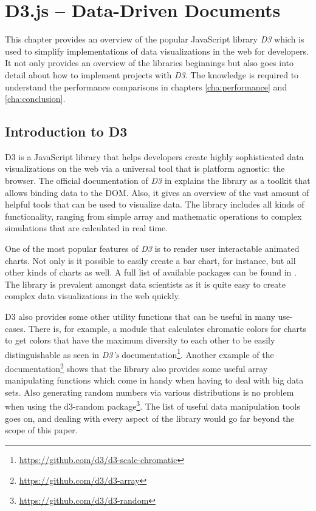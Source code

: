 \chapter{D3.js – Data-Driven Documents}
\label{cha:d3js}

This chapter provides an overview of the popular JavaScript library \emph{D3} \cite{D3Website} which is used to simplify implementations of data visualizations in the web for developers. It not only provides an overview of the libraries beginnings but also goes into detail about how to implement projects with \emph{D3}. The knowledge is required to understand the performance comparisons in chapters \ref{cha:performance} and \ref{cha:conclusion}.


\section{Introduction to D3}

D3 is a JavaScript library that helps developers create highly sophisticated data visualizations on the web via a universal tool that is platform agnostic: the browser. The official documentation of \emph{D3} in \cite{D3Website} explains the library as a toolkit that allows binding data to the DOM. Also, it gives an overview of the vast amount of helpful tools that can be used to visualize data. The library includes all kinds of functionality, ranging from simple array and mathematic operations to complex simulations that are calculated in real time.

One of the most popular features of \emph{D3} is to render user interactable animated charts. Not only is it possible to easily create a bar chart, for instance, but all other kinds of charts as well. A full list of available packages can be found in \cite{D3Github}. The library is prevalent amongst data scientists as it is quite easy to create complex data visualizations in the web quickly.

D3 also provides some other utility functions that can be useful in many use-cases. There is, for example, a module that calculates chromatic colors for charts to get colors that have the maximum diversity to each other to be easily distinguishable as seen in \emph{D3's} documentation\footnote{\url{https://github.com/d3/d3-scale-chromatic}}. Another example of the documentation\footnote{\url{https://github.com/d3/d3-array}} shows that the library also provides some useful array manipulating functions which come in handy when having to deal with big data sets. Also generating random numbers via various distributions is no problem when using the d3-random package\footnote{\url{https://github.com/d3/d3-random}}. The list of useful data manipulation tools goes on, and dealing with every aspect of the library would go far beyond the scope of this paper. 

